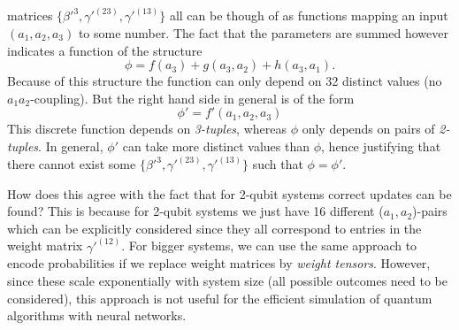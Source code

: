 \documentclass[a4]{article}
\begin{document}
matrices $\{\beta'^3,\gamma'^{(23)},\gamma'^{(13)}\}$ all can be though of as
functions mapping an input $(a_1,a_2,a_3)$ to some number. The fact that the
parameters are summed however indicates a function of the structure
\begin{equation}
    \phi = f(a_3) + g(a_3,a_2) + h(a_3,a_1).
\end{equation}
Because of this structure the function can only depend on 32 distinct values
(no $a_1a_2$-coupling). But the right hand side in general is of the form
\begin{equation}
    \phi' = f'(a_1,a_2,a_3)
\end{equation}
This discrete function depends on \textit{3-tuples}, whereas $\phi$ only depends
on pairs of \textit{2-tuples}. In general, $\phi'$ can take more distinct values
than $\phi$, hence justifying that there cannot exist some $\{\beta'^3,
\gamma'^{(23)},\gamma'^{(13)}\}$ such that $\phi=\phi'$. \par
How does this agree with the fact that for 2-qubit systems correct updates
can be found? This is because for 2-qubit systems we just have 16 different
($a_1,a_2$)-pairs which can be explicitly considered since they all correspond
to entries in the weight matrix $\gamma'^{(12)}$. For bigger systems, we can
use the same approach to encode probabilities if we replace weight matrices by
\textit{weight tensors}. However, since these scale exponentially with system
size (all possible outcomes need to be considered), this approach is not useful
for the efficient simulation of quantum algorithms with neural networks.
\end{document}
